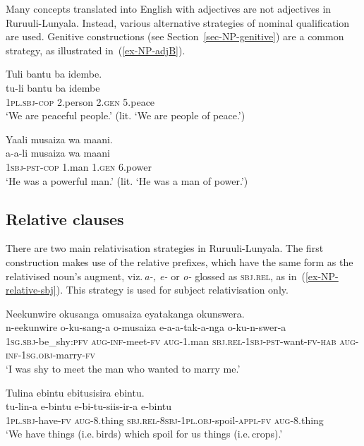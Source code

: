 Many concepts translated into English with adjectives are not adjectives in Ru\-ruu\-li\hyp{}Lu\-nya\-la. 
Instead, various alternative strategies of nominal qualification are used. 
Genitive constructions (see Section~\ref{sec-NP-genitive}) are a common strategy, as illustrated in~(\ref{ex-NP-adjB}).

\ea \label{ex-NP-adjB}
\begin{xlist}
\ex \label{ex-NP-adjB1}
	\glll  Tuli 		bantu 	ba		idembe.\\
	tu-li 		bantu 	ba		idembe\\
		1\textsc{pl.sbj}-\textsc{cop}	2.person	2.\textsc{gen}		5.peace\\
	\glt `We are peaceful people.’ (lit. ‘We are people of peace.’)
		
\ex \label{ex-NP-adjB2}
	\glll	Yaali		musaiza	wa	maani.\\
	a-a-li		musaiza	wa	maani\\
	\textsc{1sbj}-\textsc{pst}-\textsc{cop}	1.man		1.\textsc{gen}	6.power\\
	\glt ‘He was a powerful man.’ (lit. ‘He was a man of power.’)

\end{xlist}
\z


\subsection{Relative clauses} \label{sec-NP-relative}

There are two main relativisation strategies in Ru\-ruu\-li\hyp{}Lu\-nya\-la.  
The first construction makes use of the relative prefixes, which have the same form as the relativised noun's augment, viz.\,\textit{a-, e-} or \textit{o-} glossed as \textsc{sbj.rel}, as in~(\ref{ex-NP-relative-sbj}). 
This strategy is used for subject relativisation only. 

\ea \label{ex-NP-relative-sbj}
\begin{xlist}
\ex
\label{ex-NP-relative-sbja}
	\glll Neekunwire { } { } { } { } okusanga { }  { } omusaiza { } eyatakanga { }  okunswera.\\
	 n-eekunwire { } { } { } { }  o-ku-sang-a { }  { }  o-musaiza { } e-a-a-tak-a-nga  { }  o-ku-n-swer-a\\
		\textsc{1sg.sbj}-be\_shy:\textsc{pfv} { } { } { } { }  \textsc{aug}-\textsc{inf}-meet-\textsc{fv}  { }  { }  \textsc{aug}-1.man { } \textsc{sbj.rel}-\textsc{1sbj}-\textsc{pst}-want-\textsc{fv}-\textsc{hab}  { } \textsc{aug}-\textsc{inf}-\textsc{1sg.obj}-marry-\textsc{fv}\\
    \glt ‘I was shy to meet the man who wanted to marry me.’
	
\ex 	\label{ex-NP-relative-sbjb}
	\glll 	Tulina ebintu ebitusisira ebintu.\\
		tu-lin-a 		e-bintu 		e-bi-tu-siis-ir-a e-bintu\\
		1\textsc{pl.sbj}-have-\textsc{fv} 	\textsc{aug}-8.thing 	\textsc{sbj.rel}-\textsc{8sbj}-\textsc{1pl.obj}-spoil-\textsc{appl}-\textsc{fv} \textsc{aug}-8.thing\\
    \glt `We have things (i.e.\,birds) which spoil for us things (i.e.\,crops).'
	
\end{xlist}
\z

